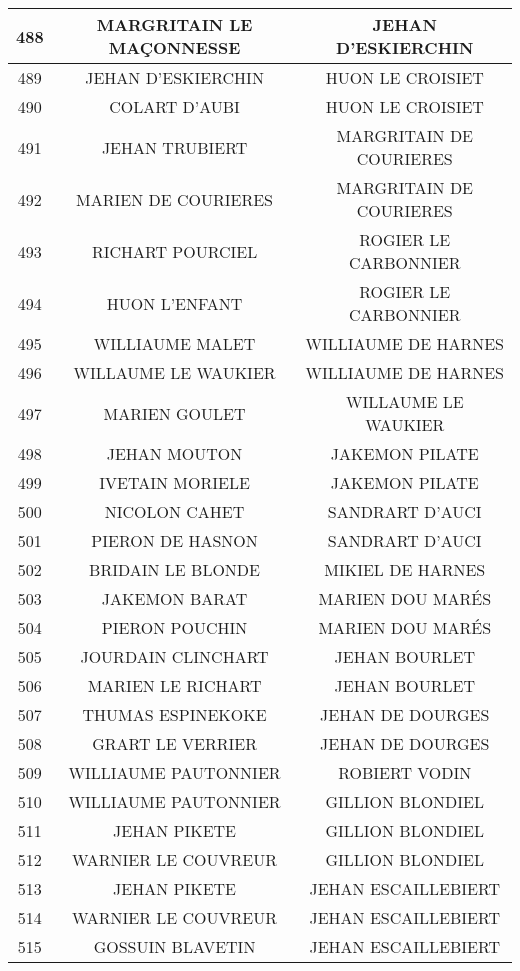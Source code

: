 \begin{center}
\begin{longtable}{|c|c|c|}
\hline	488	&	MARGRITAIN LE MAÇONNESSE	&	JEHAN D'ESKIERCHIN	\\
\hline	489	&	JEHAN D'ESKIERCHIN	&	HUON LE CROISIET	\\
\hline	490	&	COLART D'AUBI	&	HUON LE CROISIET	\\
\hline	491	&	JEHAN TRUBIERT	&	MARGRITAIN DE COURIERES	\\
\hline	492	&	MARIEN DE COURIERES	&	MARGRITAIN DE COURIERES	\\
\hline	493	&	RICHART POURCIEL	&	ROGIER LE CARBONNIER	\\
\hline	494	&	HUON L'ENFANT	&	ROGIER LE CARBONNIER	\\
\hline	495	&	WILLIAUME MALET	&	WILLIAUME DE HARNES	\\
\hline	496	&	WILLAUME LE WAUKIER	&	WILLIAUME DE HARNES	\\
\hline	497	&	MARIEN GOULET	&	WILLAUME LE WAUKIER	\\
\hline	498	&	JEHAN MOUTON	&	JAKEMON PILATE	\\
\hline	499	&	IVETAIN MORIELE	&	JAKEMON PILATE	\\
\hline	500	&	NICOLON CAHET	&	SANDRART D'AUCI	\\
\hline	501	&	PIERON DE HASNON	&	SANDRART D'AUCI	\\
\hline	502	&	BRIDAIN LE BLONDE	&	MIKIEL DE HARNES	\\
\hline	503	&	JAKEMON BARAT	&	MARIEN DOU MARÉS	\\
\hline	504	&	PIERON POUCHIN	&	MARIEN DOU MARÉS	\\
\hline	505	&	JOURDAIN CLINCHART	&	JEHAN BOURLET	\\
\hline	506	&	MARIEN LE RICHART	&	JEHAN BOURLET	\\
\hline	507	&	THUMAS ESPINEKOKE	&	JEHAN DE DOURGES	\\
\hline	508	&	GRART LE VERRIER	&	JEHAN DE DOURGES	\\
\hline	509	&	WILLIAUME PAUTONNIER	&	ROBIERT VODIN	\\
\hline	510	&	WILLIAUME PAUTONNIER	&	GILLION BLONDIEL	\\
\hline	511	&	JEHAN PIKETE	&	GILLION BLONDIEL	\\
\hline	512	&	WARNIER LE COUVREUR	&	GILLION BLONDIEL	\\
\hline	513	&	JEHAN PIKETE	&	JEHAN ESCAILLEBIERT	\\
\hline	514	&	WARNIER LE COUVREUR	&	JEHAN ESCAILLEBIERT	\\
\hline	515	&	GOSSUIN BLAVETIN	&	JEHAN ESCAILLEBIERT	\\

\end{longtable}
\end{center}
